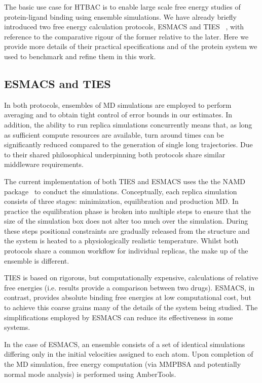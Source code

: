 The basic use case for HTBAC is to enable large scale free energy studies of
protein-ligand binding using ensemble simulations.
We have already briefly introduced two free energy calculation
protocols, ESMACS and TIES ~\cite{Wan2017brd4, Bhati2017}, with reference to the comparative rigour of the former relative to the later.
Here we provide more details of their practical specifications and of the
protein system we used to benchmark and refine them in this work.

\subsection{ESMACS and TIES}

In both protocols, ensembles of MD simulations are employed to perform averaging and to obtain tight control of error bounds in our estimates.
In addition, the ability to run replica simulations concurrently means that, as long as sufficient compute resources are available, turn around times can be significantly reduced compared to the generation of single long trajectories.
Due to their shared philosophical underpinning both protocols share similar middleware requirements.

The current implementation of both TIES and ESMACS uses the the NAMD
package~\cite{Phillips2005} to conduct the simulations.
Conceptually, each replica simulation consists of three stages: minimization, equilibration
and production MD.
In practice the equilibration phase is broken into multiple steps to ensure that the size of the
simulation box does not alter too much over the simulation.
During these steps positional constraints are gradually released from the structure and the
system is heated to a physiologically realistic temperature.
Whilst both protocols share a common workflow for individual replicas, the make up of the ensemble is different.

TIES is based on rigorous, but computationally expensive,
calculations of relative free energies (i.e. results provide a comparison
between two drugs). ESMACS, in contrast, provides absolute binding free
energies at low computational cost, but to achieve this coarse grains many of
the details of the system being studied. The simplifications employed by
ESMACS can reduce its effectiveness in some systems. 

In the case of ESMACS, an ensemble consists of a set of identical simulations differing only in
the initial velocities assigned to each atom.
Upon completion of the MD simulation, free energy computation (via MMPBSA and potentially normal
mode analysis) is performed using AmberTools.

